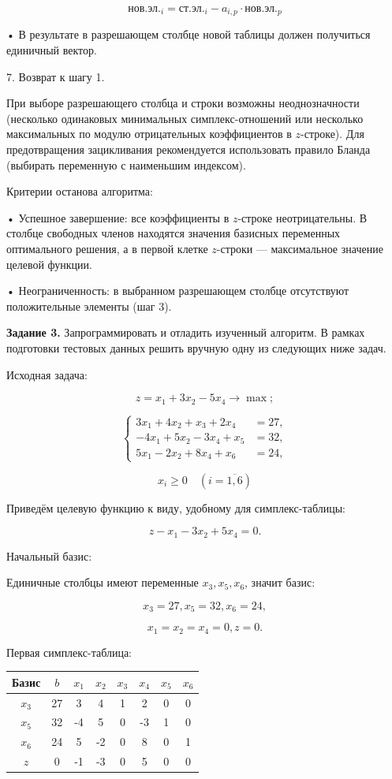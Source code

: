 \documentclass[a4paper,14pt]{extarticle}
\begin{document}
\[
\text{нов.эл.}_i=\text{ст.эл.}_i-a_{i,p}\cdot\text{нов.эл.}_p
\]

• В результате в разрешающем столбце новой таблицы должен получиться единичный вектор.

7. Возврат к шагу 1.

При выборе разрешающего столбца и строки возможны неоднозначности (несколько одинаковых минимальных симплекс-отношений или несколько максимальных по модулю отрицательных коэффициентов в $z$-строке). Для предотвращения зацикливания рекомендуется использовать правило Бланда (выбирать переменную с наименьшим индексом).

Критерии останова алгоритма:

• Успешное завершение: все коэффициенты в $z$-строке неотрицательны. В столбце свободных членов находятся значения базисных переменных оптимального решения, а в первой клетке $z$-строки — максимальное значение целевой функции.

• Неограниченность: в выбранном разрешающем столбце отсутствуют положительные элементы (шаг 3).

\textbf{Задание 3.} Запрограммировать и отладить изученный алгоритм. В рамках
подготовки тестовых данных решить вручную одну из следующих
ниже задач.

Исходная задача:

\[
z=x_1+3x_2-5x_4\rightarrow\max;
\]

\[
\left\{
\begin{aligned}
3x_1+4x_2+x_3+2x_4&=27,\\
-4x_1+5x_2-3x_4+x_5&=32,\\
5x_1-2x_2+8x_4+x_6&=24,
\end{aligned}
\right.
\]

\[
x_i\geq0 \quad (i=\overline{1,6})
\]

Приведём целевую функцию к виду, удобному для симплекс-таблицы:

\[
z-x_1-3x_2+5x_4=0.
\]

Начальный базис:

Единичные столбцы имеют переменные $x_3,x_5,x_6$, значит базис:

\[
x_3=27,x_5=32,x_6=24,
\]

\[
x_1=x_2=x_4=0,z=0.
\]

Первая симплекс-таблица:

\begin{center}
\begin{tabular}{|c|c|c|c|c|c|c|c|}
\hline
Базис & $b$ & $x_1$ & $x_2$ & $x_3$ & $x_4$ & $x_5$ & $x_6$ \\
\hline
$x_3$ & 27 & 3 & 4 & 1 & 2 & 0 & 0 \\
\hline
$x_5$ & 32 & -4 & 5 & 0 & -3 & 1 & 0 \\
\hline
$x_6$ & 24 & 5 & -2 & 0 & 8 & 0 & 1 \\
\hline
$z$ & 0 & -1 & -3 & 0 & 5 & 0 & 0 \\
\hline
\end{tabular}
\end{center}
\end{document}
